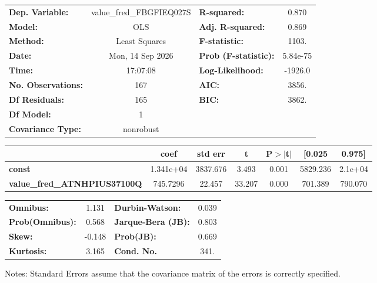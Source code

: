 \begin{center}
\begin{tabular}{lclc}
\toprule
\textbf{Dep. Variable:}              & value\_fred\_FBGFIEQ027S & \textbf{  R-squared:         } &     0.870   \\
\textbf{Model:}                      &           OLS            & \textbf{  Adj. R-squared:    } &     0.869   \\
\textbf{Method:}                     &      Least Squares       & \textbf{  F-statistic:       } &     1103.   \\
\textbf{Date:}                       &     Mon, 14 Sep 2026     & \textbf{  Prob (F-statistic):} &  5.84e-75   \\
\textbf{Time:}                       &         17:07:08         & \textbf{  Log-Likelihood:    } &   -1926.0   \\
\textbf{No. Observations:}           &             167          & \textbf{  AIC:               } &     3856.   \\
\textbf{Df Residuals:}               &             165          & \textbf{  BIC:               } &     3862.   \\
\textbf{Df Model:}                   &               1          & \textbf{                     } &             \\
\textbf{Covariance Type:}            &        nonrobust         & \textbf{                     } &             \\
\bottomrule
\end{tabular}
\begin{tabular}{lcccccc}
                                     & \textbf{coef} & \textbf{std err} & \textbf{t} & \textbf{P$> |$t$|$} & \textbf{[0.025} & \textbf{0.975]}  \\
\midrule
\textbf{const}                       &    1.341e+04  &     3837.676     &     3.493  &         0.001        &     5829.236    &      2.1e+04     \\
\textbf{value\_fred\_ATNHPIUS37100Q} &     745.7296  &       22.457     &    33.207  &         0.000        &      701.389    &      790.070     \\
\bottomrule
\end{tabular}
\begin{tabular}{lclc}
\textbf{Omnibus:}       &  1.131 & \textbf{  Durbin-Watson:     } &    0.039  \\
\textbf{Prob(Omnibus):} &  0.568 & \textbf{  Jarque-Bera (JB):  } &    0.803  \\
\textbf{Skew:}          & -0.148 & \textbf{  Prob(JB):          } &    0.669  \\
\textbf{Kurtosis:}      &  3.165 & \textbf{  Cond. No.          } &     341.  \\
\bottomrule
\end{tabular}
\end{center}

Notes: \newline
 [1] Standard Errors assume that the covariance matrix of the errors is correctly specified.